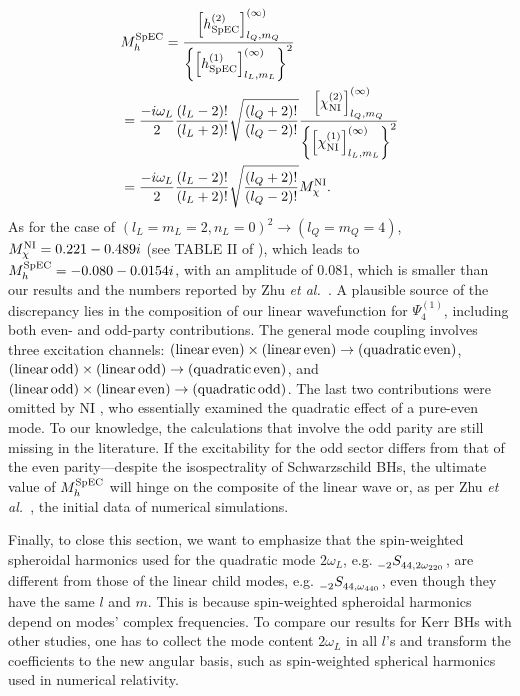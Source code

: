\documentclass[aps,prd,amsmath,floats,floatfix, twocolumn,
superscriptaddress,nofootinbib,showpacs]{revtex4-1}
\newcommand{\etal}{\textit{et al.\ }}
\begin{document}
\begin{align}
    &M_{h}^{\rm SpEC} = \frac{\left[h^{(2)}_{\rm SpEC}\right]_{l_Q,m_Q}^{(\infty)}}{\left\{\left[h^{(1)}_{\rm SpEC}\right]_{l_L,m_L}^{(\infty)}\right\}^2}\notag \\
    &=\frac{-i\omega_L}{2}\frac{(l_L-2)!}{(l_L+2)!} \sqrt{\frac{(l_Q+2)!}{(l_Q-2)!}}\frac{\left[\chi^{(2)}_{\rm NI}\right]_{l_Q,m_Q}^{(\infty)}}{\left\{\left[\chi^{(1)}_{\rm NI}\right]_{l_L,m_L}^{(\infty)}\right\}^2} \notag \\
    &=\frac{-i\omega_L}{2}\frac{(l_L-2)!}{(l_L+2)!} \sqrt{\frac{(l_Q+2)!}{(l_Q-2)!}}M_{\chi}^{\rm NI}. 
\end{align}
As for the case of $(l_L=m_L=2,n_L=0)^2 \to (l_Q=m_Q=4)$, $M_{\chi}^{\rm NI}=0.221-0.489i$ (see TABLE II of \cite{Nakano:2007cj}), which leads to $M_{h}^{\rm SpEC}=-0.080-0.0154i$, with an amplitude of 0.081, which is smaller than our results and the numbers reported by Zhu \etal \cite{Zhu:2024rej}. A plausible source of the discrepancy lies in the composition of our linear wavefunction for $\Psi_4^{(1)}$, including both even- and odd-party contributions. The general mode coupling involves three excitation channels: $({\rm linear\, even})\times({\rm linear\, even})\to ({\rm quadratic \, even})$, $({\rm linear\, odd})\times({\rm linear\, odd})\to ({\rm quadratic \, even})$, and $({\rm linear\, odd})\times({\rm linear\, even})\to ({\rm quadratic \, odd})$. The last two contributions were omitted by NI \cite{Nakano:2007cj}, who essentially examined the quadratic effect of a pure-even mode. To our knowledge, the calculations that involve the odd parity are still missing in the literature. If the excitability for the odd sector differs from that of the even parity---despite the isospectrality of Schwarzschild BHs, the ultimate value of $M_{h}^{\rm SpEC}$ will hinge on the composite of the linear wave or, as per Zhu \etal \cite{Zhu:2024rej}, the initial data of numerical simulations. 

Finally, to close this section, we want to emphasize that the spin-weighted spheroidal harmonics used for the quadratic mode $2\omega_L$, e.g. $\tensor[_{-2}]{S}{_{44,2\omega_{220}}}$, are different from those of the linear child modes, e.g. $\tensor[_{-2}]{S}{_{44,\omega_{440}}}$, even though they have the same $l$ and $m$. This is because spin-weighted spheroidal harmonics depend on modes' complex frequencies. To compare our results for Kerr BHs with other studies, one has to collect the mode content $2\omega_L$ in all $l$'s and transform the coefficients to the new angular basis, such as spin-weighted spherical harmonics used in numerical relativity.
\end{document}
